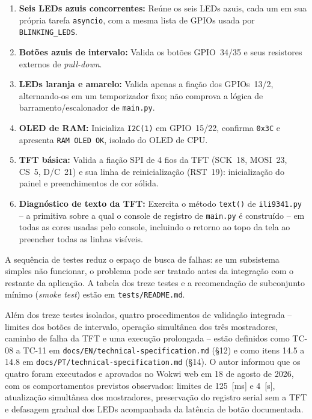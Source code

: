 \documentclass[12pt,a4paper]{article}
\begin{document}
\begin{enumerate}
  \item \textbf{Seis LEDs azuis concorrentes:} Reúne os seis LEDs azuis, cada um em sua própria tarefa \texttt{asyncio}, com a mesma lista de GPIOs usada por \texttt{BLINKING\_LEDS}.

  \item \textbf{Botões azuis de intervalo:} Valida os botões GPIO~34/35 e seus resistores externos de \textit{pull-down}.

  \item \textbf{LEDs laranja e amarelo:} Valida apenas a fiação dos GPIOs~13/2, alternando-os em um temporizador fixo; não comprova a lógica de barramento/escalonador de \texttt{main.py}.

  \item \textbf{OLED de RAM:} Inicializa \texttt{I2C(1)} em GPIO~15/22, confirma \texttt{0x3C} e apresenta \texttt{RAM OLED OK}, isolado do OLED de CPU.

  \item \textbf{TFT básica:} Valida a fiação SPI de 4 fios da TFT (SCK~18, MOSI~23, CS~5, D/C~21) e sua linha de reinicialização (RST~19): inicialização do painel e preenchimentos de cor sólida.

  \item \textbf{Diagnóstico de texto da TFT:} Exercita o método \texttt{text()} de \texttt{ili9341.py} -- a primitiva sobre a qual o console de registro de \texttt{main.py} é construído -- em todas as cores usadas pelo console, incluindo o retorno ao topo da tela ao preencher todas as linhas visíveis.

\end{enumerate}

A sequência de testes reduz o espaço de busca de falhas: se um subsistema simples não funcionar, o problema pode ser tratado antes da integração com o restante da aplicação. A tabela dos treze testes e a recomendação de subconjunto mínimo (\textit{smoke test}) estão em \texttt{tests/README.md}.

Além dos treze testes isolados, quatro procedimentos de validação integrada -- limites dos botões de intervalo, operação simultânea dos três mostradores, caminho de falha da TFT e uma execução prolongada -- estão definidos como TC-08 a TC-11 em \texttt{docs/EN/technical-specification.md} (§12) e como itens 14.5 a 14.8 em \texttt{docs/PT/technical-specification.md} (§14). O autor informou que os quatro foram executados e aprovados no Wokwi web em 18 de agosto de 2026, com os comportamentos previstos observados: limites de 125~[ms] e 4~[s], atualização simultânea dos mostradores, preservação do registro serial sem a TFT e defasagem gradual dos LEDs acompanhada da latência de botão documentada.
\end{document}

